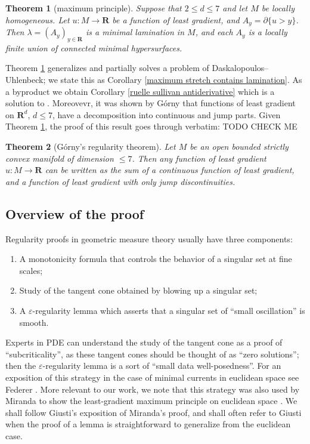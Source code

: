 \documentclass[reqno,12pt,letterpaper]{amsart}
\newcommand{\RR}{\mathbf{R}}
\newtheorem{theorem}{Theorem}[section]
\theoremstyle{definition}
\numberwithin{equation}{section}
\begin{document}
\begin{theorem}[maximum principle]\label{main thm}
Suppose that $2 \leq d \leq 7$ and let $M$ be locally homogeneous.
Let $u: M \to \RR$ be a function of least gradient, and $A_y = \partial \{u > y\}$.
Then $\lambda = (A_y)_{y \in \RR}$ is a minimal lamination in $M$, and each $A_y$ is a locally finite union of connected minimal hypersurfaces.
\end{theorem}

Theorem \ref{main thm} generalizes \cite[Proposition 3.4]{górny2017planar} and partially solves a problem \cite[Problem 9.5]{daskalopoulos2020transverse} of Daskalopoulos--Uhlenbeck; we state this as Corollary \ref{maximum stretch contains lamination}.
As a byproduct we obtain Corollary \ref{ruelle sullivan antiderivative} which is a solution to \cite[Problem 9.7]{daskalopoulos2020transverse}.
Moreovevr, it was shown by G\'orny \cite[Theorem 1.2]{górny2017planar} that functions of least gradient on $\RR^d$, $d \leq 7$, have a decomposition into continuous and jump parts.
Given Theorem \ref{main thm}, the proof of this result goes through verbatim: TODO CHECK ME

\begin{theorem}[G\'orny's regularity theorem]\label{Gorny regularity}
Let $M$ be an open bounded strictly convex manifold of dimension $\leq 7$.
Then any function of least gradient $u: M \to \RR$ can be written as the sum of a continuous function of least gradient, and a function of least gradient with only jump discontinuities.
\end{theorem}

\subsection{Overview of the proof}
Regularity proofs in geometric measure theory usually have three components:
\begin{enumerate}
\item A monotonicity formula that controls the behavior of a singular set at fine scales;
\item Study of the tangent cone obtained by blowing up a singular set;
\item A $\varepsilon$-regularity lemma which asserts that a singular set of ``small oscillation'' is smooth.
\end{enumerate}
Experts in PDE can understand the study of the tangent cone as a proof of ``subcriticality'', as these tangent cones should be thought of as ``zero solutions''; then the $\varepsilon$-regularity lemma is a sort of ``small data well-posedness''.
For an exposition of this strategy in the case of minimal currents in euclidean space see Federer \cite[\S5.3]{federer2014geometric}.
More relevant to our work, we note that this strategy was also used by Miranda to show the least-gradient maximum principle on euclidean space \cite{Miranda64, Miranda66, Miranda67}.
We shall follow Giusti's exposition \cite{Giusti77} of Miranda's proof, and shall often refer to Giusti when the proof of a lemma is straightforward to generalize from the euclidean case.
\end{document}
